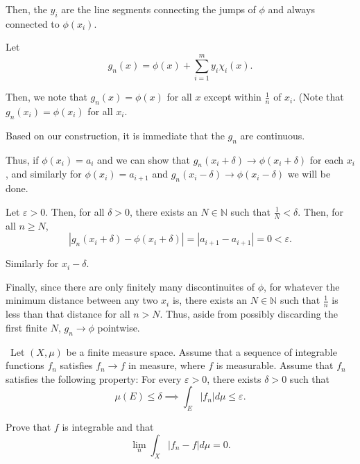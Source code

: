 \documentclass[12pt]{Qual}
\begin{document}
\begin{solution}
Then, the $y_i$ are the line segments connecting the jumps of $\phi$ and always connected to $\phi(x_i)$.

Let $$g_n(x)=\phi(x)+\sum_{i=1}^my_i\chi_i(x).$$

Then, we note that $g_n(x)=\phi(x)$ for all $x$ except within $\frac{1}{n}$ of $x_i$. (Note that $g_n(x_i)=\phi(x_i)$ for all $x_i$.

Based on our construction, it is immediate that the $g_n$ are continuous.

Thus, if $\phi(x_i)=a_i$ and we can show that $g_n(x_i+\delta)\to \phi(x_i+\delta)$ for each $x_i$, and similarly for $\phi(x_i)=a_{i+1}$ and $g_n(x_i-\delta)\to\phi(x_i-\delta)$ we will be done.

Let $\varepsilon>0$. Then, for all $\delta>0$, there exists an $N\in\mathbb{N}$ such that $\frac{1}{N}<\delta$. Then, for all $n\ge N$, $$|g_n(x_i+\delta)-\phi(x_i+\delta)|=|a_{i+1}-a_{i+1}|=0<\varepsilon.$$

Similarly for $x_i-\delta$.

Finally, since there are only finitely many discontinuites of $\phi$, for whatever the minimum distance between any two $x_i$ is, there exists an $N\in\mathbb{N}$ such that $\frac{1}{n}$ is less than that distance for all $n>N$. Thus, aside from possibly discarding the first finite $N$, $g_n\to \phi$ pointwise.
\end{solution}
\newpage

\begin{problem} $\,$
Let $(X,\mu)$ be a finite measure space. Assume that a sequence of integrable functions $f_n$ satisfies $f_n\to f$ in measure, where $f$ is measurable. Assume that $f_n$ satisfies the following property: For every $\varepsilon>0$, there exists $\delta>0$ such that $$\mu(E)\le \delta\implies\int_E|f_n|d\mu\le\varepsilon.$$

Prove that $f$ is integrable and that $$\lim_n\int_X|f_n-f|d\mu=0.$$
\end{problem}
\end{document}
